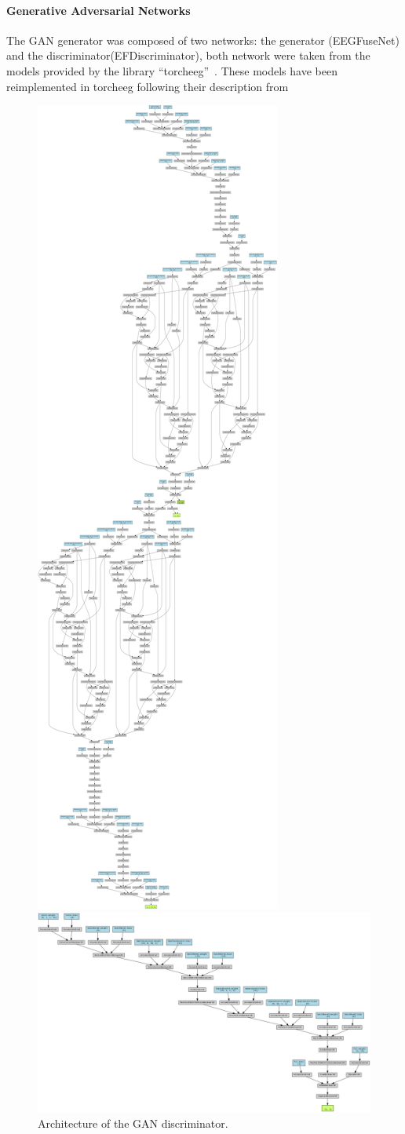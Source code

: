 \paragraph*{Generative Adversarial Networks}
The GAN generator was composed of two networks: the generator (EEGFuseNet) and the discriminator(EFDiscriminator), both network were taken from the models provided by the library ``torcheeg''~\cite{zhang2024torcheeg}.
These models have been reimplemented in torcheeg following their description from~\cite{liang2021eegfusenet}
\begin{figure}[!htbp]
    \centering
    \begin{minipage}[b]{.45\textwidth}
        \centering
        \includegraphics[width=.2\textwidth]{Figures/Methodology/EEGFuseNet}
        \caption{Architecture of the GAN generator.}\label{fig:gan_generator} 
        \vfill   
    \end{minipage}
    \hfill
    \begin{minipage}[b]{.45\textwidth}
        \centering
        \includegraphics[width=\textwidth]{Figures/Methodology/EFDiscriminator}
        \caption{Architecture of the GAN discriminator.}\label{fig:gan_discriminator}
    \end{minipage}
\end{figure}


